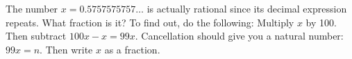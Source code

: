 The number $x=0.5757575757\dots$ is actually rational since its decimal expression repeats.  What fraction is it?  To find out, do the following: Multiply $x$ by 100.  Then subtract $100x - x = 99x$.  Cancellation should give you a natural number: $99x = n$.  Then write $x$ as a fraction.
